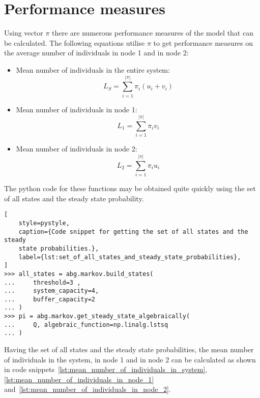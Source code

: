 \section{Performance measures}
Using vector \(\pi\) there are numerous performance measures of the model that
can be calculated.
The following equations utilise \(\pi\) to get performance measures on the
average number of individuals in node 1 and in node 2:

\begin{itemize}
    \item Mean number of individuals in the entire system:
        \begin{equation}
            L_S = \sum_{i=1}^{|\pi|} \pi_i (u_i + v_i)
        \end{equation}
    \item Mean number of individuals in node 1:
        \begin{equation}
            L_1 = \sum_{i=1}^{|\pi|} \pi_i v_i
        \end{equation}
    \item Mean number of individuals in node 2:
        \begin{equation}
            L_2 = \sum_{i=1}^{|\pi|} \pi_i u_i
        \end{equation}
\end{itemize}

The python code for these functions may be obtained quite quickly using the set
of all states and the steady state probability.

\begin{lstlisting}[
    style=pystyle,
    caption={Code snippet for getting the set of all states and the steady
    state probabilities.},
    label={lst:set_of_all_states_and_steady_state_probabilities},
]
>>> all_states = abg.markov.build_states(
...     threshold=3 ,
...     system_capacity=4,
...     buffer_capacity=2
... )
>>> pi = abg.markov.get_steady_state_algebraically(
...     Q, algebraic_function=np.linalg.lstsq
... )

\end{lstlisting}

Having the set of all states and the steady state probabilities, the mean
number of individuals in the system, in node 1 and in node 2 can be calculated
as shown in code snippets~\ref{lst:mean_number_of_individuals_in_system},
\ref{lst:mean_number_of_individuals_in_node_1}
and~\ref{lst:mean_number_of_individuals_in_node_2}.

